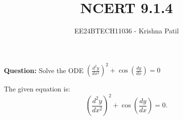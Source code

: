 \documentclass[journal]{IEEEtran}
\begin{document}

\vspace{3cm}

\title{NCERT 9.1.4}
\author{EE24BTECH11036 - Krishna Patil}

{\let\newpage\relax\maketitle}

\renewcommand{\thefigure}{\theenumi}
\renewcommand{\thetable}{\theenumi}
\setlength{\intextsep}{10pt} %

\textbf{Question:} Solve the ODE \((\frac{d^2y}{dx^2})^2 + \cos\left(\frac{dy}{dx}\right) = 0\)

\solution
    The given equation is:
    \[ \left(\frac{d^2y}{dx^2}\right)^2 + \cos\left(\frac{dy}{dx}\right) = 0. \]
\end{document}

